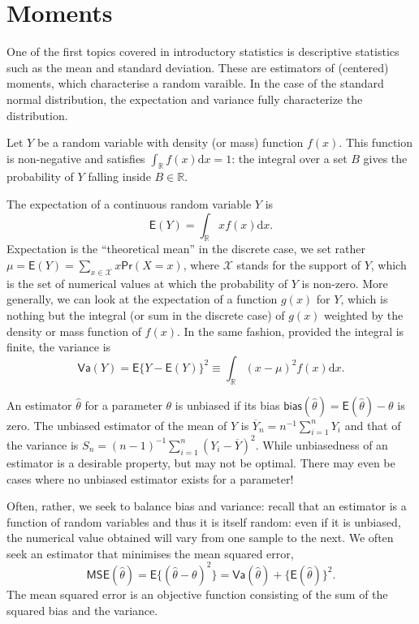 \documentclass[
  11pt,
  letterpaper,
]{book}
\theoremstyle{definition}
\theoremstyle{definition}
\theoremstyle{definition}
\theoremstyle{remark}
\begin{document}
\hypertarget{moments}{%
\section{Moments}\label{moments}}

One of the first topics covered in introductory statistics is descriptive statistics such as the mean and standard deviation. These are estimators of (centered) moments, which characterise a random varaible. In the case of the standard normal distribution, the expectation and variance fully characterize the distribution.

Let \(Y\) be a random variable with density (or mass) function \(f(x)\). This function is non-negative and satisfies \(\int_{\mathbb{R}} f(x) \mathrm{d}x=1\): the integral over a set \(B\) gives the probability of \(Y\) falling inside \(B \in \mathbb{R}\).

The expectation of a continuous random variable \(Y\) is \[\mathsf{E}(Y)=\int_{\mathbb{R}} x f(x) \mathrm{d} x.\]
Expectation is the ``theoretical mean'' in the discrete case, we set rather \(\mu = \mathsf{E}(Y)=\sum_{x \in \mathcal{X}} x \mathsf{Pr}(X=x)\), where \(\mathcal{X}\) stands for the support of \(Y\), which is the set of numerical values at which the probability of \(Y\) is non-zero. More generally, we can look at the expectation of a function \(g(x)\) for \(Y\), which is nothing but the integral (or sum in the discrete case) of \(g(x)\) weighted by the density or mass function of \(f(x)\). In the same fashion, provided the integral is finite, the variance is
\[\mathsf{Va}(Y)=\mathsf{E}\{Y-\mathsf{E}(Y)\}^2 \equiv \int_{\mathbb{R}} (x-\mu)^2 f(x) \mathrm{d} x.\]

An estimator \(\hat{\theta}\) for a parameter \(\theta\) is unbiased if its bias \(\mathsf{bias}(\hat{\theta})=\mathsf{E}(\hat{\theta})- \theta\) is zero.
The unbiased estimator of the mean of \(Y\) is \(\overline{Y}_n = n^{-1} \sum_{i=1}^n Y_i\) and that of the variance is \(S_n = (n-1)^{-1} \sum_{i=1}^n (Y_i-\overline{Y})^2\). While unbiasedness of an estimator is a desirable property, but may not be optimal. There may even be cases where no unbiased estimator exists for a parameter!

Often, rather, we seek to balance bias and variance: recall that an estimator is a function of random variables and thus it is itself random: even if it is unbiased, the numerical value obtained will vary from one sample to the next. We often seek an estimator that minimises the mean squared error, \[\mathsf{MSE}(\hat{\theta}) = \mathsf{E}\{(\hat{\theta}-\theta)^2\}=\mathsf{Va}(\hat{\theta}) + \{\mathsf{E}(\hat{\theta})\}^2.\]
The mean squared error is an objective function consisting of the sum of the squared bias and the variance.
\end{document}

